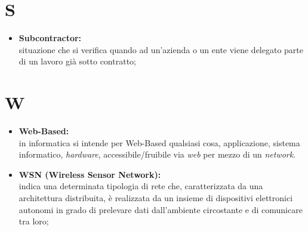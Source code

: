 \documentclass[11pt]{book}              %
\begin{document}
\section*{S}

\begin{itemize}

	\item \textbf{{\color{Plum} Subcontractor}:}\\
	situazione che si verifica quando ad un'azienda o un ente viene delegato parte di un lavoro già sotto contratto;

\end{itemize}

\section*{W}
\begin{itemize}
	\item \textbf{{\color{Plum}Web-Based}:} \\
	in informatica si intende per Web-Based qualsiasi cosa, applicazione, sistema informatico, \textit{hardware}, accessibile/fruibile via \textit{web} per mezzo di un \textit{network}.
	
	\item \textbf{{\color{OliveGreen} WSN} (Wireless Sensor Network):} \\
	 indica una determinata tipologia di rete che, caratterizzata da una architettura distribuita, è realizzata da un insieme di dispositivi elettronici autonomi in grado di prelevare dati dall'ambiente circostante e di comunicare tra loro;


\end{itemize}
\end{document}

